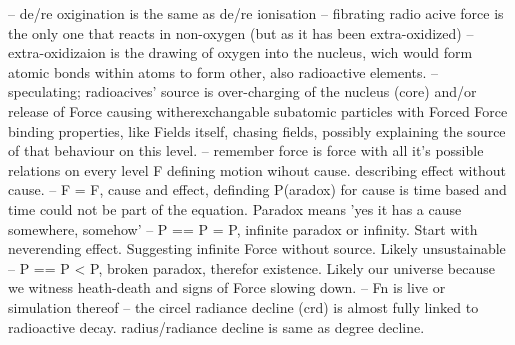 -- de/re oxigination is the same as de/re ionisation
-- fibrating radio acive force is the only one that reacts in non-oxygen (but as it has been extra-oxidized)
-- extra-oxidizaion is the drawing of oxygen into the nucleus, wich would form atomic bonds within atoms to form other, also radioactive elements.
-- speculating; radioacives' source is over-charging of the nucleus (core) and/or release of Force causing witherexchangable subatomic particles with Forced Force binding properties,
like Fields itself, chasing fields, possibly explaining the source of that behaviour on this level.
-- remember force is force with all it's possible relations on every level F defining motion wihout cause. describing effect without cause.
-- F = F, cause and effect, definding P(aradox) for cause is time based and time could not be part of the equation. Paradox means 'yes it has a cause somewhere, somehow'
-- P == P = P, infinite paradox or infinity. Start with neverending effect. Suggesting infinite Force without source. Likely unsustainable
-- P == P < P, broken paradox, therefor existence. Likely our universe because we witness heath-death and signs of Force slowing down.
-- Fn is live or simulation thereof
-- the circel radiance decline (crd) is almost fully linked to radioactive decay. radius/radiance decline is same as degree decline.



